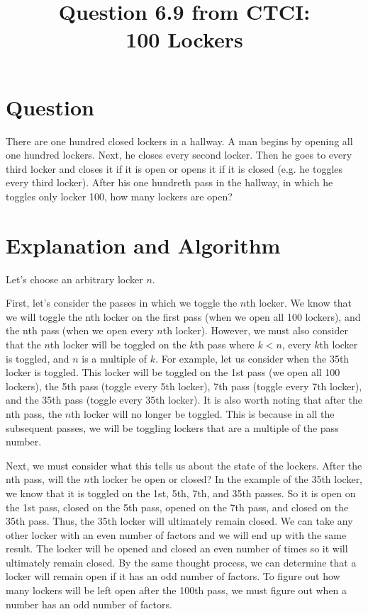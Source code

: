 \documentclass{article}
\title{%
  Question 6.9 from CTCI: \\
  100 Lockers}
\begin{document}
\maketitle 

\section*{Question}

There are one hundred closed lockers in a hallway. A man begins by opening all one hundred lockers. Next, he closes every second locker. Then he goes to every third locker and closes it if it is open or opens it if it is closed (e.g. he toggles every third locker). After his one hundreth pass in the hallway, in which he toggles only locker 100, how many lockers are open? 

\section*{Explanation and Algorithm}

Let's choose an arbitrary locker $n$.

First, let's consider the passes in which we toggle the $n$th locker. We know that we will toggle the nth locker on the first pass (when we open all 100 lockers), and the nth pass (when we open every $n$th locker). However, we must also consider that the $n$th locker will be toggled on the $k$th pass where $k < n$, every $k$th locker is toggled, and $n$ is a multiple of $k$. For example, let us consider when the 35th locker is toggled. This locker will be toggled on the 1st pass (we open all 100 lockers), the 5th pass (toggle every 5th locker), 7th pass (toggle every 7th locker), and the 35th pass (toggle every 35th locker). It is also worth noting that after the nth pass, the $n$th locker will no longer be toggled. This is because in all the subsequent passes, we will be toggling lockers that are a multiple of the pass number.

Next, we must consider what this tells us about the state of the lockers. After the nth pass, will the $n$th locker be open or closed?  In the example of the 35th locker, we know that it is toggled on the 1st, 5th, 7th, and 35th passes. So it is open on the 1st pass, closed on the 5th pass, opened on the 7th pass, and closed on the 35th pass. Thus, the 35th locker will ultimately remain closed. We can take any other locker with an even number of factors and we will end up with the same result. The locker will be opened and closed an even number of times so it will ultimately remain closed. By the same thought process, we can determine that a locker will remain open if it has an odd number of factors. To figure out how many lockers will be left open after the 100th pass, we must figure out when a number has an odd number of factors.
\end{document}
